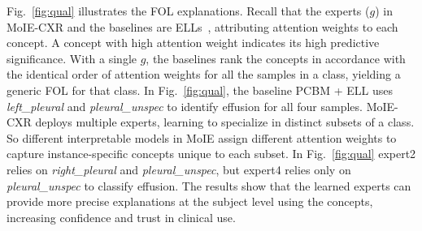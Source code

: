 Fig.~\ref{fig:qual} illustrates the FOL explanations. Recall that the experts ($g$) in MoIE-CXR and the baselines are ELLs~\cite{barbiero2022entropy}, attributing attention weights to each concept. A concept with high attention weight indicates its high predictive significance. With a single $g$, the baselines rank the concepts in accordance with the identical order of attention weights for all the samples in a class, yielding  a generic FOL for that class. In Fig.~\ref{fig:qual}, the baseline PCBM + ELL uses \emph{left\_pleural} and \emph{pleural\_unspec} to identify effusion for all four samples. MoIE-CXR deploys multiple experts, learning to specialize in distinct subsets of a class. So different interpretable models in MoIE assign different attention weights to capture instance-specific concepts unique to each subset. In Fig.~\ref{fig:qual} expert2 relies on \emph{right\_pleural} and \emph{pleural\_unspec}, but expert4 relies only on \emph{pleural\_unspec} to classify effusion. 
The results show that the learned experts can provide more precise explanations at the subject level using the concepts, increasing confidence and trust in clinical use. 